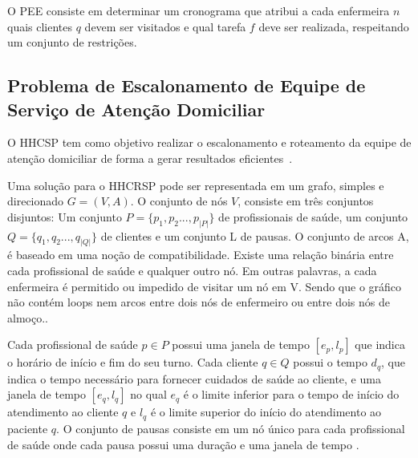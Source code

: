 O \ac{PEE} consiste em determinar um cronograma que atribui a cada enfermeira $n$ quais clientes $q$ devem ser visitados e qual tarefa $f$ deve ser realizada, respeitando um conjunto de restrições\cite{mansini:2016}.

\subsection{Problema de Escalonamento de Equipe de Serviço de Atenção Domiciliar}


O \ac{HHCSP} tem como objetivo realizar o escalonamento e roteamento da equipe de atenção domiciliar de forma a gerar resultados eficientes~\cite{bachouch:2010}.




Uma solução para o \ac{HHCRSP} pode ser representada em um grafo, simples e direcionado $G = (V,A)$. O conjunto de nós $V$, consiste em três conjuntos disjuntos: Um conjunto $P = \{ p_1, p_2 ..., p_{|P|} \}$ de profissionais de saúde, um conjunto $Q = \{ q_1, q_2 ..., q_{|Q|} \}$ de clientes e um conjunto L de pausas. O conjunto de arcos A, é baseado em uma noção de compatibilidade. Existe uma relação binária entre cada profissional de saúde e qualquer outro nó. Em outras palavras, a cada enfermeira é permitido ou impedido de visitar um nó em V. Sendo que o gráfico não contém loops nem arcos entre dois nós de enfermeiro ou entre dois nós de almoço.\cite{cheng:98}. 

Cada profissional de saúde $p \in P$ possui uma janela de tempo $[e_p, l_p]$ que indica o horário de início e fim do seu turno. Cada cliente $q \in Q$ possui o tempo $d_q$, que indica o tempo necessário para fornecer cuidados de saúde ao cliente, e uma janela de tempo $[e_q,l_q]$ no qual $e_q$ é o limite inferior para o tempo de início do atendimento ao cliente $q$ e  $l_q$ é o limite superior do início do atendimento ao paciente $q$. O conjunto de pausas consiste em um nó único para cada profissional de saúde onde cada pausa possui uma duração e uma janela de tempo \cite{cheng:98}.